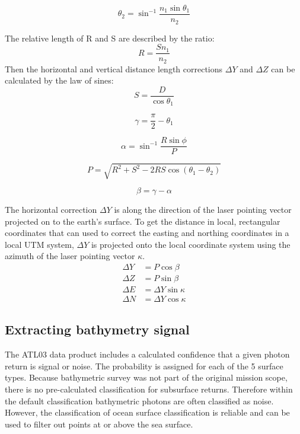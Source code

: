 \begin{equation}\label{eq:snellslaw}
      \theta_2 = \sin^{-1}{\frac{n_1 \sin{\theta_1}}{n_2}}
\end{equation}

The relative length of R and S are described by the ratio:
\begin{equation}
      R = \frac{S n_1}{n_2}
\end{equation}
Then the horizontal and vertical distance length corrections $\Delta Y$ and $\Delta Z$ can be calculated by the law of sines:
\begin{equation}
      S = \frac{D}{\cos{\theta_1}}
\end{equation}

\begin{equation}
      \gamma = \frac{\pi}{2} - \theta_1
\end{equation}

\begin{equation}
      \alpha = \sin^{-1}{\frac{R \sin{\phi}}{P}}
\end{equation}

\begin{equation}
      P = \sqrt{R^2 + S^2 - 2RS \cos{(\theta_1 - \theta_2)}}
\end{equation}

\begin{equation}
      \beta = \gamma - \alpha
\end{equation}

The horizontal correction $\Delta Y$ is along the direction of the laser pointing vector projected on to the earth's surface. To get the distance in local, rectangular coordinates that can used to correct the easting and northing coordinates in a local UTM system, $\Delta Y$ is projected onto the local coordinate system using the azimuth of the laser pointing vector $\kappa$.
\begin{align}
      \Delta Y & = P \cos{\beta}         \\
      \Delta Z & = P \sin{\beta}         \\
      \Delta E & = \Delta Y \sin{\kappa} \\
      \Delta N & = \Delta Y \cos{\kappa}
\end{align}



\subsection{Extracting bathymetry signal}\label{subsec:signal-finding}
The ATL03 data product includes a calculated confidence that a given photon return is signal or noise. The probability is assigned for each of the 5 surface types. Because bathymetric survey was not part of the original mission scope, there is no pre-calculated classification for subsurface returns. Therefore within the default classification bathymetric photons are often classified as noise. However, the classification of ocean surface classification is reliable \parencite{}  and can be used to filter out points at or above the sea surface.

